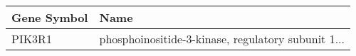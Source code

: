 \begin{tabular}{ll}
\toprule
Gene Symbol &                                               Name \\
\midrule
     PIK3R1 & phosphoinositide-3-kinase, regulatory subunit 1... \\
\bottomrule
\end{tabular}
